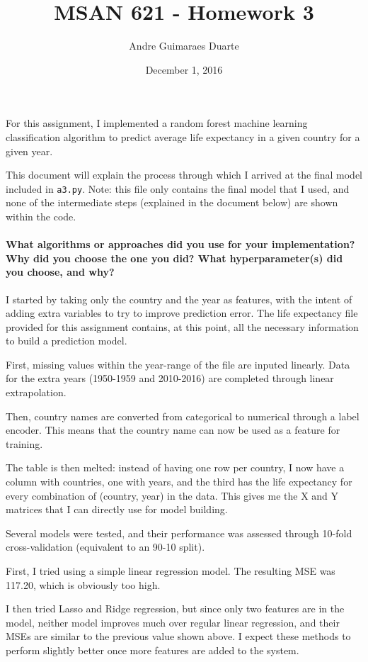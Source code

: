 \documentclass[]{article}
\title{MSAN 621 - Homework 3}
\author{Andre Guimaraes Duarte}
\date{December 1, 2016}
\let\oldparagraph\paragraph
\renewcommand{\paragraph}[1]{\oldparagraph{#1}\mbox{}}
\begin{document}
\maketitle

For this assignment, I implemented a random forest machine learning classification algorithm to predict average life expectancy in a given country for a given year.

This document will explain the process through which I arrived at the final model included in \texttt{a3.py}. Note: this file only contains the final model that I used, and none of the intermediate steps (explained in the document below) are shown within the code.

\paragraph{What algorithms or approaches did you use for your implementation? Why did you choose the one you did? What hyperparameter(s) did you choose, and why?}

I started by taking only the country and the year as features, with the intent of adding extra variables to try to improve prediction error. The life expectancy file provided for this assignment contains, at this point, all the necessary information to build a prediction model.

First, missing values within the year-range of the file are inputed linearly. Data for the extra years (1950-1959 and 2010-2016) are completed through linear extrapolation.

Then, country names are converted from categorical to numerical through a label encoder. This means that the country name can now be used as a feature for training. 

The table is then melted: instead of having one row per country, I now have a column with countries, one with years, and the third has the life expectancy for every combination of (country, year) in the data. This gives me the X and Y matrices that I can directly use for model building.

Several models were tested, and their performance was assessed through 10-fold cross-validation (equivalent to an 90-10 split).

First, I tried using a simple linear regression model. The resulting MSE was 117.20, which is obviously too high.

I then tried Lasso and Ridge regression, but since only two features are in the model, neither model improves much over regular linear regression, and their MSEs are similar to the previous value shown above. I expect these methods to perform slightly better once more features are added to the system.
\end{document}
